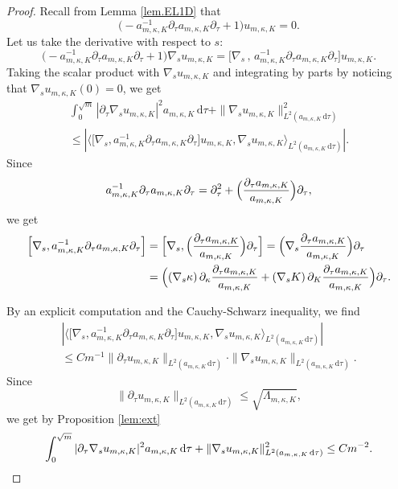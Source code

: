 \documentclass[10pt]{amsart}
\theoremstyle{plain}
\theoremstyle{definition}
\newcommand{\dx}{\mathrm{\,d}}
\let\pa\partial
\begin{document}
\begin{proof}
Recall from Lemma \ref{lem.EL1D} that
\[\bigl(- a^{-1}_{m,\kappa,K}\partial_\tau a_{m,\kappa,K}\partial_\tau
+1\bigr)u_{m,\kappa, K}=0.\]
Let us take the derivative with respect to $s$:
\[\bigl(- a^{-1}_{m,\kappa,K}\partial_\tau a_{m,\kappa,K}\partial_\tau
+1 \bigr)\nabla_{s} u_{m,\kappa, K}= \bigl[\nabla_{s}\,,\,a^{-1}_{m,\kappa,K}\partial_\tau a_{m,\kappa,K}\partial_\tau \bigr]u_{m,\kappa, K}.\]
Taking the scalar product with $\nabla_{s} u_{m,\kappa, K}$ and integrating by parts by noticing that $\nabla_{s} u_{m,\kappa, K}(0)=0$, we get
\begin{multline*}
\int_{0}^{\sqrt{m}} |\partial_{\tau} \nabla_{s}u_{m,\kappa, K}|^2a_{m,\kappa, K}\dx\tau+\|\nabla_{s} u_{m,\kappa, K}\|^2_{L^2(a_{m,\kappa,K}\dx\tau)}\\
\leq \left|\bigl\langle \bigl[\nabla_{s},a^{-1}_{m,\kappa,K}\partial_\tau a_{m,\kappa,K}\partial_\tau \bigr]u_{m,\kappa, K},\nabla_{s} u_{m,\kappa, K} \bigr\rangle_{L^2(a_{m,\kappa, K}\dx\tau)}\right|.
\end{multline*}
Since
\[
a^{-1}_{m,\kappa,K}\partial_\tau a_{m,\kappa,K}\partial_\tau = \pa_\tau^2 + \Bigl(\frac{\pa_\tau a_{m,\kappa,K}}{a_{m,\kappa,K}}\Bigr)\pa_\tau,
\]
we get
\[\begin{split}
\Bigl[\nabla_{s},a^{-1}_{m,\kappa,K}\partial_\tau a_{m,\kappa,K}\partial_\tau\Bigr]
&= \Bigl[\nabla_{s}, \Bigl(\frac{\pa_\tau a_{m,\kappa,K}}{a_{m,\kappa,K}} \Bigr)\pa_\tau \Bigr]
= \Bigl(\nabla_s\frac{\pa_\tau a_{m,\kappa,K}}{a_{m,\kappa,K}} \Bigr)\pa_\tau
\\&= \Bigl(
\left(\nabla_s \kappa\right)\pa_\kappa\frac{\pa_\tau a_{m,\kappa,K}}{a_{m,\kappa,K}}
+\left(\nabla_s K\right)\pa_K\frac{\pa_\tau a_{m,\kappa,K}}{a_{m,\kappa,K}}
\Bigr)\pa_\tau.
\end{split}\]

By an explicit computation and the Cauchy-Schwarz inequality, we find
\begin{multline*}
\left| \bigl\langle \bigl[\nabla_{s},a^{-1}_{m,\kappa,K}\partial_\tau a_{m,\kappa,K}\partial_\tau \bigr]u_{m,\kappa, K},\nabla_{s} u_{m,\kappa, K} \bigr\rangle_{L^2(a_{m,\kappa, K}\dx\tau)}\right|\\
\leq Cm^{-1}\|\partial_{\tau}u_{m,\kappa,K}\|_{L^2(a_{m,\kappa, K}\dx\tau)}\cdot\|\nabla_{s}u_{m,\kappa, K}\|_{L^2(a_{m,\kappa, K}\dx\tau)}.
\end{multline*}
Since
\[\|\partial_{\tau}u_{m,\kappa,K}\|_{L^2(a_{m,\kappa, K}\dx\tau)}\leq \sqrt{\Lambda_{m,\kappa, K}},\]
we get by Proposition \ref{lem:ext}
\[\int_{0}^{\sqrt{m}} |\partial_{\tau} \nabla_{s}u_{m,\kappa, K}|^2a_{m,\kappa, K}\dx\tau+\|\nabla_{s} u_{m,\kappa, K}\|^2_{L^2(a_{m,\kappa,K}\dx\tau)}\leq Cm^{-2}.\qedhere\]
\end{proof}
\end{document}
